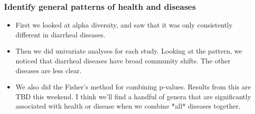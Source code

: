 \documentclass[12pt]{article}
\begin{document}
\subsubsection{Identify general patterns of health and diseases}

\begin{itemize}
\item First we looked at alpha diversity, and saw that it was only consistently 
different in diarrheal diseases.
\item Then we did univariate analyses for each study. Looking at the pattern, we noticed 
that diarrheal diseases have broad community shifts. The other diseases are less clear.
\item We also did the Fisher's method for combining p-values. Results from this 
are TBD this weekend. I think we'll find a handful of genera that are significantly
associated with health or disease when we combine *all* diseases together.
\end{itemize}




\end{document}
